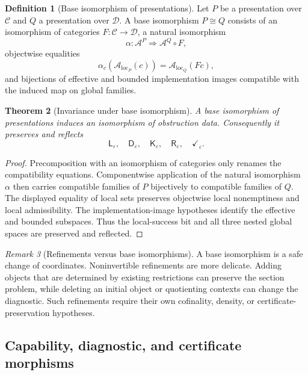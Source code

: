 \documentclass[11pt]{article}
\theoremstyle{plain}
\newtheorem{theorem}{Theorem}[section]
\theoremstyle{definition}
\newtheorem{definition}[theorem]{Definition}
\theoremstyle{remark}
\newtheorem{remark}[theorem]{Remark}
\newcommand{\LocalAdm}{\mathcal{A}_{\mathrm{loc}}}
\newcommand{\eps}{\varepsilon}
\begin{document}
\begin{definition}[Base isomorphism of presentations]
\label{def:base-isomorphism-presentations}
Let $P$ be a presentation over $\mathcal C$ and $Q$ a presentation over
$\mathcal D$. A base isomorphism $P\cong Q$ consists of an isomorphism of
categories $F:\mathcal C\to\mathcal D$, a natural isomorphism
\[
\alpha:\mathcal A^P\Rightarrow \mathcal A^Q\circ F,
\]
objectwise equalities
\[
\alpha_c(\LocalAdm_P(c))=\LocalAdm_Q(Fc),
\]
and bijections of effective and bounded implementation images compatible with
the induced map on global families.
\end{definition}

\begin{theorem}[Invariance under base isomorphism]
\label{thm:base-isomorphism-invariance}
A base isomorphism of presentations induces an isomorphism of obstruction data.
Consequently it preserves and reflects
\[
\mathsf L_\eps,\quad \mathsf D_\eps,\quad \mathsf K_\eps,\quad
\mathsf R_\eps,\quad \checkmark_\eps .
\]
\end{theorem}

\begin{proof}
Precomposition with an isomorphism of categories only renames the compatibility
equations. Componentwise application of the natural isomorphism $\alpha$ then
carries compatible families of $P$ bijectively to compatible families of $Q$.
The displayed equality of local sets preserves objectwise local nonemptiness and
local admissibility. The implementation-image hypotheses identify the effective
and bounded subspaces. Thus the local-success bit and all three nested global
spaces are preserved and reflected.
\end{proof}

\begin{remark}[Refinements versus base isomorphisms]
A base isomorphism is a safe change of coordinates. Noninvertible refinements are
more delicate. Adding objects that are determined by existing restrictions can
preserve the section problem, while deleting an initial object or quotienting
contexts can change the diagnostic. Such refinements require their own
cofinality, density, or certificate-preservation hypotheses.
\end{remark}

\subsection{Capability, diagnostic, and certificate morphisms}
\end{document}
